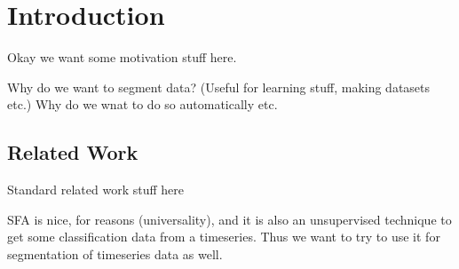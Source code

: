 \section{Introduction}
Okay we want some motivation stuff here. 

Why do we want to segment data? (Useful for learning stuff, making datasets etc.) Why do we wnat to do so automatically etc.
\subsection{Related Work}
Standard related work stuff here



SFA is nice, for reasons (universality), and it is also an unsupervised technique to get some classification data from a timeseries. Thus we want to try to use it for segmentation of timeseries data as well.
